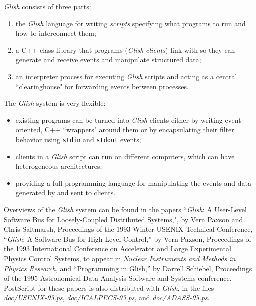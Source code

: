 {\em Glish} consists of three parts:
\begin{enumerate}

\item the {\em Glish} language for writing {\em scripts}
specifying what programs to run and how to interconnect them;

\item a C++ class library
that programs ({\em Glish} {\em clients\/})
link with so they can generate and receive events and manipulate
structured data;

\item an interpreter process for executing {\em
Glish} scripts
and acting as a central ``clearinghouse" for forwarding events between
processes.

\end{enumerate}

The {\em Glish} system is very flexible:
\begin{itemize}

\item existing programs can be turned into {\em Glish} clients either by
writing event-oriented, C++ ``wrappers"
around them or by encapsulating
their filter behavior
using {\tt stdin} and {\tt stdout} events;

\item clients in a {\em Glish} script can run on different computers,
which can have heterogeneous architectures;

\item providing a full programming language for manipulating the
events and data generated by and sent to clients.

\end{itemize}

Overviews of the {\em Glish} system can be found in the
papers ``{\em Glish\/}:
A User-Level Software Bus for Loosely-Coupled Distributed Systems,",
by Vern Paxson and Chris Saltmarsh, Proceedings of the 1993 Winter USENIX
Technical Conference, ``{\em Glish\/}: A Software Bus for
High-Level Control,'' by Vern Paxson, Proceedings of the 1993 International
Conference on Accelerator and Large Experimental Physics Control Systems,
to appear in {\em Nuclear Instruments and Methods in Physics Research\/},
and ``Programming in Glish,'' by Darrell Schiebel, Proceedings of the 1995
Astronomical Data Analysis Software and Systems conference. PostScript for
these papers is also distributed with {\em Glish}, in the files
\mbox{\em doc/USENIX-93.ps\/}, \mbox{\em doc/ICALPECS-93.ps}, and
\mbox{\em doc/ADASS-95.ps}.

